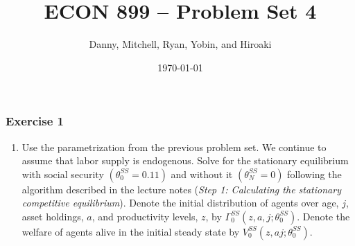 \documentclass{article} %
\title{ECON 899 -- Problem Set 4}
\author{Danny, Mitchell, Ryan, Yobin, and Hiroaki}
\date{\today}
\theoremstyle{definition}
\begin{document}
\maketitle
\subsubsection*{Exercise 1}
\begin{enumerate}
\item  Use the parametrization from the previous problem set. We continue to assume that labor supply is endogenous. Solve for the stationary equilibrium with social security $ (\theta^{SS}_0 = 0.11) $ and without it $ (\theta^{SS}_N = 0) $ following the algorithm described in the lecture notes (\textit{Step 1: Calculating the stationary competitive equilibrium}). Denote the initial distribution of agents over age, $ j $, asset holdings, $ a $, and productivity levels, $ z $, by $  \Gamma_0^{SS}(z,a,j;\theta_0^{SS}) $. Denote the welfare of agents alive in the initial steady state by $ V_0^{SS}(z,aj;\theta_0^{SS})$.
  

\end{enumerate}
\end{document}
